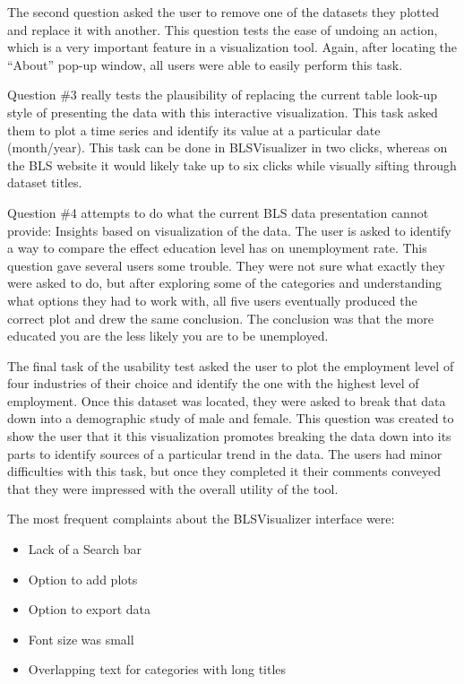 \documentclass{sigchi}
\begin{document}
{The second question asked the user to remove one of the datasets they plotted and replace it with another. This question tests the ease of undoing an action, which is a very important feature in a visualization tool. Again, after locating the ``About'' pop-up window, all users were able to easily perform this task.

Question \#3 really tests the plausibility of replacing the current table look-up style of presenting the data with this interactive visualization. This task asked them to plot a time series and identify its value at a particular date (month/year). This task can be done in BLSVisualizer in two clicks, whereas on the BLS website it would likely take up to six clicks while visually sifting through dataset titles.

Question \#4 attempts to do what the current BLS data presentation cannot provide: Insights based on visualization of the data. The user is asked to identify a way to compare the effect education level has on unemployment rate. This question gave several users some trouble. They were not sure what exactly they were asked to do, but after exploring some of the categories and understanding what options they had to work with, all five users eventually produced the correct plot and drew the same conclusion. The conclusion was that the more educated you are the less likely you are to be unemployed.

The final task of the usability test asked the user to plot the employment level of four industries of their choice and identify the one with the highest level of employment. Once this dataset was located, they were asked to break that data down into a demographic study of male and female. This question was created to show the user that it this visualization promotes breaking the data down into its parts to identify sources of a particular trend in the data. The users had minor difficulties with this task, but once they completed it their comments conveyed that they were impressed with the overall utility of the tool.


The most frequent complaints about the BLSVisualizer interface were:
\begin{itemize}
  \item Lack of a Search bar
  \item Option to add plots
  \item Option to export data
  \item Font size was small
  \item Overlapping text for categories with long titles
\end{itemize} }
\end{document}
